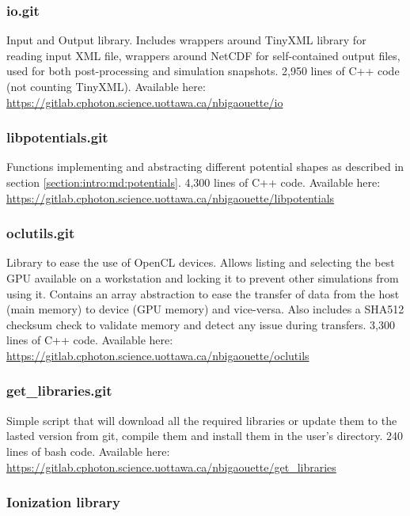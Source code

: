 \subsubsection{io.git} \label{section:tools:libraries:io}
Input and Output library. Includes wrappers around TinyXML library\cite{tinyxml}
for reading input XML file, wrappers around NetCDF\cite{netcdf} for self-contained
output files, used for both post-processing and simulation snapshots.
2,950 lines of C++ code (not counting TinyXML). Available here:
\url{https://gitlab.cphoton.science.uottawa.ca/nbigaouette/io}

\subsubsection{libpotentials.git} \label{section:tools:libraries:libpotentials}
Functions implementing and abstracting different potential shapes as
described in section \ref{section:intro:md:potentials}. 4,300 lines of C++ code.
Available here:
\url{https://gitlab.cphoton.science.uottawa.ca/nbigaouette/libpotentials}

\subsubsection{oclutils.git} \label{section:tools:libraries:oclutils}
Library to ease the use of OpenCL devices. Allows listing and selecting the
best GPU available on a workstation and locking it to prevent
other simulations from using it. Contains an array abstraction to ease the
transfer of data from the host (main memory) to device (GPU memory) and
vice-versa. Also includes a SHA512 checksum check to validate memory
and detect any issue during transfers. 3,300 lines of C++ code.
Available here:
\url{https://gitlab.cphoton.science.uottawa.ca/nbigaouette/oclutils}

\subsubsection{get\_libraries.git} \label{section:tools:libraries:getlibraries}
Simple script that will download all the required libraries or
update them to the lasted version from git, compile them and install them in the
user's directory. 240 lines of bash code.
Available here:
\url{https://gitlab.cphoton.science.uottawa.ca/nbigaouette/get_libraries}



\subsubsection{Ionization library}
\label{section:tools:libraries:ionization}

